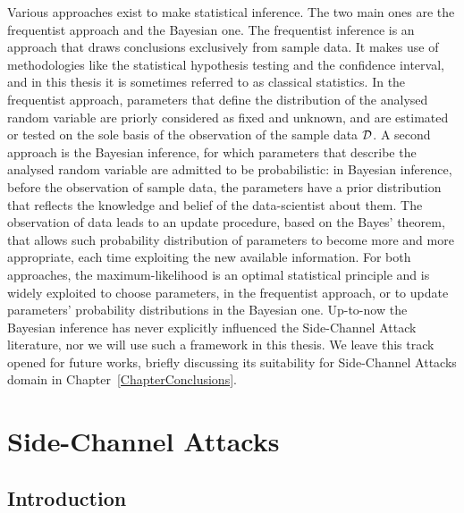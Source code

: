 Various approaches exist to make statistical inference. The two main ones are the frequentist approach and the Bayesian one. The frequentist inference is an approach that draws conclusions exclusively from sample data. It makes use of methodologies like the statistical hypothesis testing and the confidence interval, and in this thesis it is sometimes referred to as classical statistics. In the frequentist approach, parameters that define the distribution of the analysed random variable are priorly considered as fixed and unknown, and are estimated or tested on the sole basis of the observation of the sample data $\mathcal{D}$. A second approach is the Bayesian inference, for which parameters that describe the analysed random variable are admitted to be probabilistic: in Bayesian inference, before the observation of sample data, the parameters have a prior distribution that reflects the knowledge and belief of the data-scientist about them. The observation of data leads to an update procedure, based on the Bayes' theorem, that allows such probability distribution of parameters to become more and more appropriate, each time exploiting the new available information. For both approaches, the maximum-likelihood is an optimal statistical principle and is widely exploited to choose parameters, in the frequentist approach, or to update parameters' probability distributions in the Bayesian one. Up-to-now the Bayesian inference has never explicitly influenced the Side-Channel Attack literature, nor we will use such a framework in this thesis. We leave this track opened for future works, briefly discussing its suitability for Side-Channel Attacks domain in Chapter~\ref{ChapterConclusions}.

\section{Side-Channel Attacks}
\subsection{Introduction}
